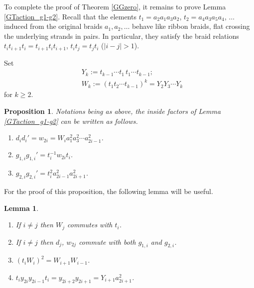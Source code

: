 \documentclass[a4paper,10pt,reqno]{amsart}
\newtheorem{prop}[thm]{Proposition}
\newtheorem{lem}[thm]{Lemma}
\begin{document}
To complete the proof of Theorem \ref{GGzero}, it remains 
to prove Lemma \ref{GTaction_g1-g2}.
Recall that the elements $t_1=a_2a_1a_3a_2$,
$t_2=a_4a_3a_5a_4$, $\dots$ 
induced from the original braids $a_1,a_2,\dots$
behave like ribbon braids, flat crossing the underlying strands
in pairs.
In particular, they satisfy the braid relations
$t_it_{i+1}t_i=t_{i+1}t_it_{i+1}$,
$t_it_j=t_jt_i$ ($|i-j|>1$).

Set
\begin{align*}
&Y_k:=t_{k-1}\cdots t_1\, t_1\cdots t_{k-1};\\
&W_k:=(t_1t_2\cdots t_{k-1})^k=Y_2 Y_3 \cdots Y_k
\end{align*}
for $k\ge 2$.

\begin{prop} \label{AppBprop}
Notations being as above,
the inside factors of Lemma \ref{GTaction_g1-g2}
can be written as follows.
\begin{enumerate}
\item
$d_id_i' =w_{2i}=W_ia_1^2a_3^2\cdots a_{2i-1}^2$.

\item $g_{1,i}g_{1,i}'=t_i^{-1}w_{2i}t_i$.

\item
$g_{2,i}g_{2,i}'=t_i^2a_{2i-1}^2a_{2i+1}^2$.

\end{enumerate}
\end{prop}


For the proof of this proposition, 
the following lemma will be useful.
\begin{lem}
\label{exLemma}
\begin{enumerate}
\item[(i)] If $i\ne j$ then $W_j$ commutes with $t_i$.
\item[(ii)] If $i\ne j$ then $d_j$, $w_{2j}$ 
commute with both 
$g_{1,i}$ and $g_{2,i}$.
\item[(iii)] $(t_iW_i)^2=W_{i+1}W_{i-1}$.
\item[(iv)] $t_iy_{2i}y_{2i-1}t_i=y_{2i+2}y_{2i+1}=Y_{i+1}a_{2i+1}^2$.
\end{enumerate}
\end{lem}
\end{document}
